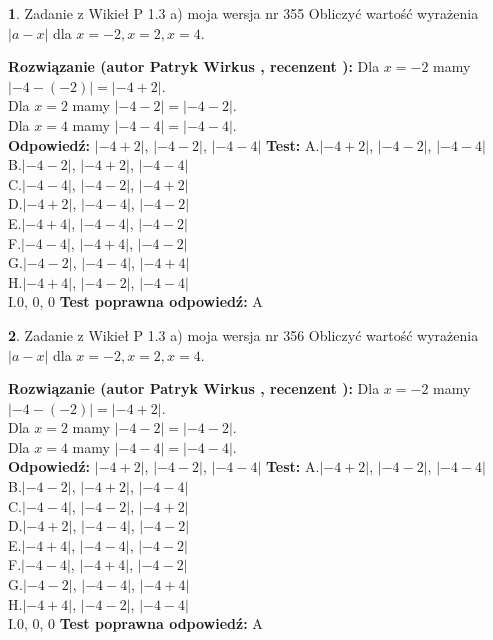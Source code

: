 \documentclass[12pt, a4paper]{article}
\theoremstyle{definition} %
\newtheorem{zad}{}
\newcommand{\zadStart}[1]{\begin{zad}#1\newline}
\newcommand{\zadStop}{\end{zad}}
\newcommand{\rozwStart}[2]{\noindent \textbf{Rozwiązanie (autor #1 , recenzent #2): }\newline}
\newcommand{\rozwStop}{\newline}
\newcommand{\odpStart}{\noindent \textbf{Odpowiedź:}\newline}
\newcommand{\odpStop}{\newline}
\newcommand{\testStart}{\noindent \textbf{Test:}\newline}
\newcommand{\testStop}{\newline}
\newcommand{\kluczStart}{\noindent \textbf{Test poprawna odpowiedź:}\newline}
\newcommand{\kluczStop}{\newline}
\begin{document}
\zadStart{Zadanie z Wikieł P 1.3 a) moja wersja nr 355}
Obliczyć wartość wyrażenia $|a - x|$ dla $x=-2,x=2,x=4$.
\zadStop
\rozwStart{Patryk Wirkus}{}
Dla $x = -2$ mamy $|-4 - (-2)| = |-4 + 2|$.\\
Dla $x = 2$ mamy $|-4 - 2| = |-4 - 2|$.\\
Dla $x = 4$ mamy $|-4 - 4| = |-4 - 4|$.\\
\rozwStop
\odpStart
$|-4 + 2|$, $|-4 - 2|$, $|-4 - 4|$
\odpStop
\testStart
A.$|-4 + 2|$, $|-4 - 2|$, $|-4 - 4|$\\
B.$|-4 - 2|$, $|-4 + 2|$, $|-4 - 4|$\\
C.$|-4 - 4|$, $|-4 - 2|$, $|-4 + 2|$\\
D.$|-4 + 2|$, $|-4 - 4|$, $|-4 - 2|$\\
E.$|-4 + 4|$, $|-4 - 4|$, $|-4 - 2|$\\
F.$|-4 - 4|$, $|-4 + 4|$, $|-4 - 2|$\\
G.$|-4 - 2|$, $|-4 - 4|$, $|-4 + 4|$\\
H.$|-4 + 4|$, $|-4 - 2|$, $|-4 - 4|$\\
I.$0$, $0$, $0$
\testStop
\kluczStart
A
\kluczStop



\zadStart{Zadanie z Wikieł P 1.3 a) moja wersja nr 356}
Obliczyć wartość wyrażenia $|a - x|$ dla $x=-2,x=2,x=4$.
\zadStop
\rozwStart{Patryk Wirkus}{}
Dla $x = -2$ mamy $|-4 - (-2)| = |-4 + 2|$.\\
Dla $x = 2$ mamy $|-4 - 2| = |-4 - 2|$.\\
Dla $x = 4$ mamy $|-4 - 4| = |-4 - 4|$.\\
\rozwStop
\odpStart
$|-4 + 2|$, $|-4 - 2|$, $|-4 - 4|$
\odpStop
\testStart
A.$|-4 + 2|$, $|-4 - 2|$, $|-4 - 4|$\\
B.$|-4 - 2|$, $|-4 + 2|$, $|-4 - 4|$\\
C.$|-4 - 4|$, $|-4 - 2|$, $|-4 + 2|$\\
D.$|-4 + 2|$, $|-4 - 4|$, $|-4 - 2|$\\
E.$|-4 + 4|$, $|-4 - 4|$, $|-4 - 2|$\\
F.$|-4 - 4|$, $|-4 + 4|$, $|-4 - 2|$\\
G.$|-4 - 2|$, $|-4 - 4|$, $|-4 + 4|$\\
H.$|-4 + 4|$, $|-4 - 2|$, $|-4 - 4|$\\
I.$0$, $0$, $0$
\testStop
\kluczStart
A
\kluczStop
\end{document}
